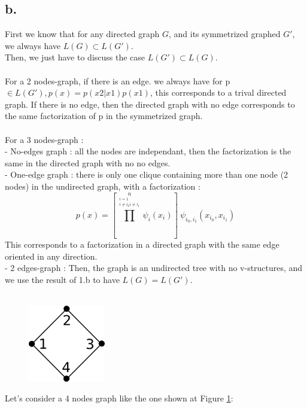 \documentclass[12pt]{article}
\begin{document}
\subsection*{b.}
First we know that for any directed graph $G$, and its symmetrized graphed $G'$, we always have $L(G)\subset L(G')$.~\\
Then, we just have to discuss the case $L(G') \subset  L(G)$.~\\
~\\
For a 2 nodes-graph, if there is an edge. we always have for p $\in L(G'), p(x)=p(x2|x1)p(x1)$, this corresponds to a trival directed graph. If there is no edge, then the directed graph with no edge corresponds to the same factorization of p in the symmetrized graph.~\\
~\\
For a 3 nodes-graph :~\\
- No-edges graph : all the nodes are independant, then the factorization is the same in the directed graph with no no edges.~\\
- One-edge graph : there is only one clique containing more than one node (2 nodes)  in the undirected graph, with a factorization :~\\
$$p(x) = [\prod^n \limits_{\substack{i=1 \\ i \neq i_{0} i \neq {i_{1}} } }\psi_{i}(x_i)] \: \psi_{i_{0},i_{1}}(x_{i_{0}},x_{i_{1}})$$
This corresponds to a factorization in a directed graph with the same edge oriented in any direction.~\\
- 2 edges-graph : Then, the graph is an undirected tree with no v-structures, and we use the result of 1.b to have $L(G)=L(G')$.~\\
~\\
\begin{figure}
	\vspace{-40pt}
	\begin{center}
		\includegraphics[width=0.3\textwidth]{./pics/counterexample.png}
	\end{center}
	\vspace{-20pt}
	\caption{}
	\label{fig:counterexample}
\end{figure}
Let's consider a 4 nodes graph like the one shown at Figure \ref{fig:counterexample}:
\end{document}
